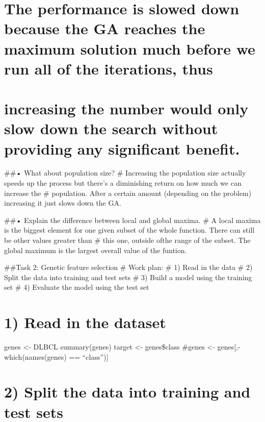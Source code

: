 \documentclass[]{article}
\begin{document}
\hypertarget{the-performance-is-slowed-down-because-the-ga-reaches-the-maximum-solution-much-before-we-run-all-of-the-iterations-thus}{%
\section{The performance is slowed down because the GA reaches the
maximum solution much before we run all of the iterations,
thus}\label{the-performance-is-slowed-down-because-the-ga-reaches-the-maximum-solution-much-before-we-run-all-of-the-iterations-thus}}

\hypertarget{increasing-the-number-would-only-slow-down-the-search-without-providing-any-significant-benefit.}{%
\section{increasing the number would only slow down the search without
providing any significant
benefit.}\label{increasing-the-number-would-only-slow-down-the-search-without-providing-any-significant-benefit.}}

\#\#• What about population size? \# Increasing the population size
actually speeds up the process but there's a diminishing return on how
much we can increase the \# population. After a certain amount
(depending on the problem) increasing it just slows down the GA.

\#\#• Explain the difference between local and global maxima. \# A local
maxima is the biggest element for one given subset of the whole
function. There can still be other values greater than \# this one,
outside ofthe range of the subset. The global maximum is the largest
overall value of the funtion.

\#\#Task 2: Genetic feature selection \# Work plan: \# 1) Read in the
data \# 2) Split the data into training and test sets \# 3) Build a
model using the training set \# 4) Evaluate the model using the test set

\hypertarget{read-in-the-dataset}{%
\section{1) Read in the dataset}\label{read-in-the-dataset}}

genes \textless- DLBCL summary(genes) target \textless- genes\$class
\#genes \textless- genes{[},-which(names(genes) == ``class''){]}

\hypertarget{split-the-data-into-training-and-test-sets}{%
\section{2) Split the data into training and test
sets}\label{split-the-data-into-training-and-test-sets}}
\end{document}

